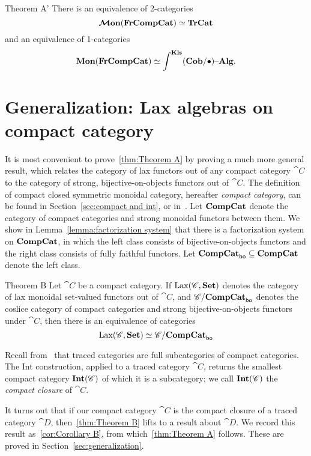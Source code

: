 \documentclass[12pt,oneside,article,draft]{memoir}
\begin{document}
\begin{named}{Theorem A'}
   There is an equivalence of 2-categories
   \[
      \bm{\mathcal{M}}\mathbf{on}(\mathbf{FrCompCat})\simeq\mathbf{TrCat}
   \]
   and an equivalence of 1-categories
   \[
      \mathbf{Mon}(\mathbf{FrCompCat})\simeq\int^{\mathbf{Kls}}(\mathbf{Cob}/\bullet){\text \textendash}\mathbf{Alg}.
   \]
\end{named}


\section{Generalization: Lax algebras on compact category}

It is most convenient to prove~\ref{thm:Theorem A} by proving a much more general result, which relates the category of lax functors out of any compact category $\cat{C}$ to the category of strong, bijective-on-objects functors out of $\cat{C}$.
The definition of compact closed symmetric monoidal category, hereafter \emph{compact category}, can be found in Section~\ref{sec:compact and int}, or in~\cite{MacLane}.
Let $\mathbf{CompCat}$ denote the category of compact categories and strong monoidal functors between them.
We show in Lemma~\ref{lemma:factorization system} that there is a factorization system on $\mathbf{CompCat}$, in which the left class consists of bijective-on-objects functors and the right class consists of fully faithful functors.
Let $\mathbf{CompCat}_{\mathsf{bo}}\subseteq\mathbf{CompCat}$ denote the left class.

\begin{named}{Theorem B}
   Let $\cat{C}$ be a compact category.
   If $\operatorname{Lax}(\mathscr{C},\mathbf{Set})$ denotes the category of lax monoidal set-valued functors out of $\cat{C}$, and $\mathscr{C}/\mathbf{CompCat}_{\mathsf{bo}}$ denotes the coslice category of compact categories and strong bijective-on-objects functors under $\cat{C}$, then there is an equivalence of categories
   \begin{equation}\label{dia:compact lax strong}
      \operatorname{Lax}(\mathscr{C},\mathbf{Set})\simeq\mathscr{C}/\mathbf{CompCat}_{\mathsf{bo}}
   \end{equation}
\end{named}

Recall from~\cite{JoyalStreetVerity} that traced categories are full subcategories of compact categories.
The Int construction, applied to a traced category $\cat{C}$, returns the smallest compact category $\mathbf{Int}(\mathscr{C})$ of which it is a subcategory; we call $\mathbf{Int}(\mathscr{C})$ the \emph{compact closure} of $\cat{C}$.

It turns out that if our compact category $\cat{C}$ is the compact closure of a traced category $\cat{D}$, then~\ref{thm:Theorem B} lifts to a result about $\cat{D}$.
We record this result as~\ref{cor:Corollary B}, from which~\ref{thm:Theorem A} follows.
These are proved in Section~\ref{sec:generalization}.
\end{document}
